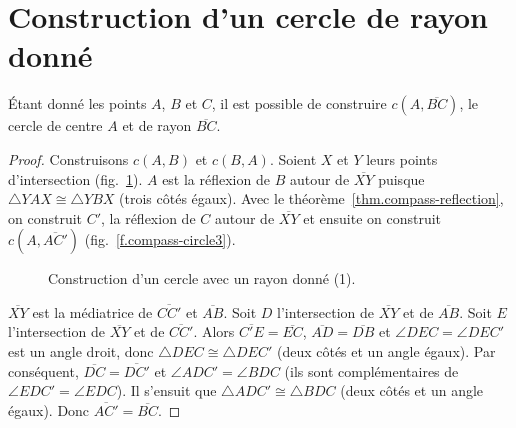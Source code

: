 


\section{Construction d'un cercle de rayon donné}\label{s.circle}

\begin{theorem}\label{thm.compass-radius}
Étant donné les points $A$, $B$ et $C$, il est possible de construire $c(A,\overline{BC})$, le cercle de centre $A$ et de rayon $\overline{BC}$.
\end{theorem}

\begin{proof}
Construisons $c(A,B)$ et $c(B,A)$. Soient $X$ et $Y$  leurs points d'intersection (fig.~\ref{f.compass-circle1}). $A$ est la réflexion de $B$ autour de $\overline{XY}$ puisque $\triangle YAX\cong \triangle YBX$ (trois côtés égaux). Avec le théorème~\ref{thm.compass-reflection}, on construit $C'$, la réflexion de $C$ autour de $\overline{XY}$ et ensuite on construit $c(A,\overline{AC'})$ (fig.~\ref{f.compass-circle3}).

\begin{figure}[htbp]
\centering
{}
\caption{Construction d'un cercle avec un rayon donné (1).}\label{f.compass-circle1}
\end{figure}

$\overline{XY}$ est la médiatrice de $\overline{CC'}$ et $\overline{AB}$. Soit $D$ l'intersection de $\overline{XY}$ et de $\overline{AB}$. Soit $E$ l'intersection de $\overline{XY}$ et de $\overline{CC'}$. Alors $\overline{C'E}=\overline{EC}$, $\overline{AD}=\overline{DB}$ et $\angle DEC=\angle DEC'$ est un angle droit, donc $\triangle DEC\cong\triangle DEC'$ (deux côtés et un angle égaux). Par conséquent, $\overline{DC}=\overline{DC'}$ et $\angle ADC'=\angle BDC$ (ils sont complémentaires de $\angle EDC'=\angle EDC$). Il s'ensuit que $\triangle ADC'\cong\triangle BDC$ (deux côtés et un angle égaux).  Donc $\overline{AC'}=\overline{BC}$.
\end{proof}

